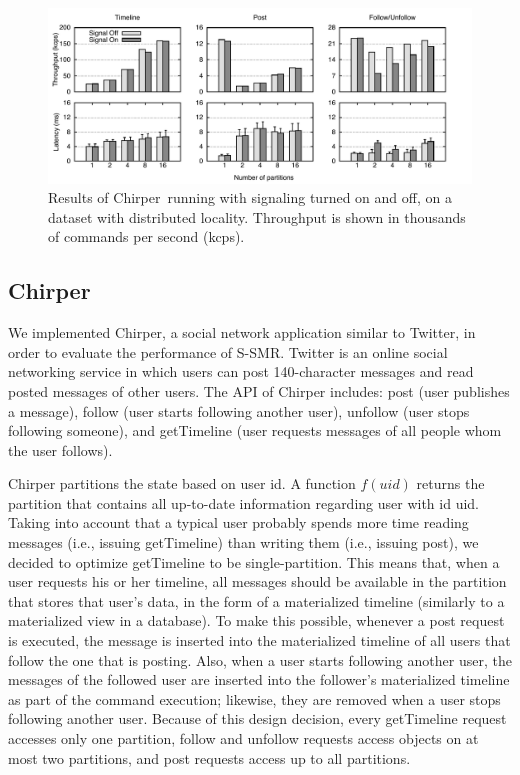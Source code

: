 \documentclass[11pt]{article}
\newcommand{\ssmr}{\mbox{S-SMR}}
\newcommand{\appname}{Chirper} %
\begin{document}
\begin{figure}
\begin{minipage}[b]{1\linewidth} %
\centering
      \includegraphics[width=1\linewidth]{figures/sc-at-scale-locality}
\end{minipage}
\caption{Results of \appname\ running with signaling turned on and off, on a dataset with distributed locality. Throughput is shown in thousands of commands per second (kcps).}
\label{fig:perf}
\end{figure}

\subsection{\appname}
We implemented \appname{}, a social network application similar to Twitter, in order to evaluate the performance of \ssmr{}.
Twitter is an online social networking service in which users can post 140-character messages and read posted messages of other users.
The API of \appname{} includes: post (user publishes a message), follow (user starts following another user), unfollow (user stops following someone), and getTimeline (user requests messages of all people whom the user follows).

\appname{} partitions the state based on user id. A function $f(uid)$ returns the partition that contains all up-to-date information regarding user with id uid. Taking into account that a typical user probably spends more time reading messages (i.e., issuing getTimeline) than writing them (i.e., issuing post), we decided to optimize getTimeline to be single-partition. This means that, when a user requests his or her timeline, all messages should be available in the partition that stores that user's data, in the form of a materialized timeline (similarly to a materialized view in a database). To make this possible, whenever a post request is executed, the message is inserted into the materialized timeline of all users that follow the one that is posting. Also, when a user starts following another user, the messages of the followed user are inserted into the follower's materialized timeline as part of the command execution; likewise, they are removed when a user stops following another user. Because of this design decision, every getTimeline request accesses only one partition, follow and unfollow requests access objects on at most two partitions, and post requests access up to all partitions.
\end{document}
